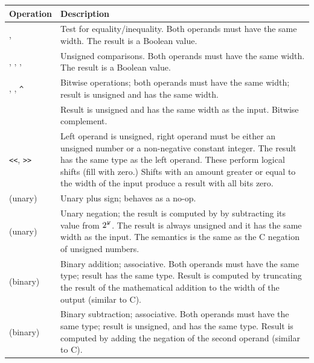 \documentclass[12pt]{article}
\begin{document}
\begin{table}[!h]
  \center
  \begin{tabular}{|lp{\descwidth}|} \hline
    \textbf{Operation} & \textbf{Description} \\ \hline

    \code{==}, \code{!=} & Test for equality/inequality.  Both
    operands must have the same width.  The result is a Boolean
    value. \\

    \code{<}, \code{>}, \code{<=}, \code{>=} & Unsigned comparisons.
    Both operands must have the same width.  The result is a Boolean
    value. \\
    
    \code{\&}, \code{|}, \verb|^| & Bitwise operations; both operands
    must have the same width; result is unsigned and has the same
    width.  \\
    
    \code{\~{}} & Result is unsigned and has the same width as the
    input.  Bitwise complement. \\

    \verb|<<|, \verb|>>| & Left operand is unsigned, right operand
    must be either an unsigned number or a non-negative constant
    integer.  The result has the same type as the left operand.  These
    perform logical shifts (fill with zero.)  Shifts with an amount
    greater or equal to the width of the input produce a result with
    all bits zero. \\

    \code{+} (unary) & Unary plus sign; behaves as a no-op. \\
    
    \code{-} (unary) & Unary negation; the result is computed by by
    subtracting its value from $2^{\texttt{\emph{W}}}$.  The result is always unsigned
    and it has the same width as the input.  The semantics is the same
    as the C negation of unsigned numbers. \\

    \code{+} (binary) & Binary addition; associative.  Both operands
    must have the same type; result has the same type.  Result is
    computed by truncating the result of the mathematical addition to
    the width of the output (similar to C). \\
    
    \code{-} (binary) & Binary subtraction; associative.  Both
    operands must have the same type; result is unsigned, and has the
    same type.  Result is computed by adding the negation of the
    second operand (similar to C). \\
    

\end{tabular}
\end{table}
\end{document}
